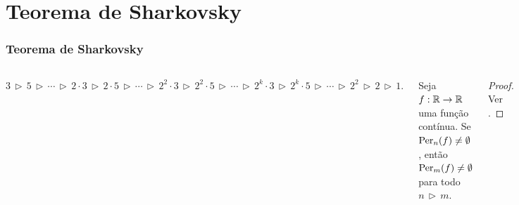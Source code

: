 \section{Teorema de Sharkovsky}


\begin{frame}
\vspace{5pt}
\frametitle{Teorema de Sharkovsky}
\begin{columns}
\column{\dimexpr\paperwidth-15pt}

\begin{definition}
$3 \, \triangleright \, 5 
\, \triangleright \, \cdots \, \triangleright \,
2 \cdot 3 \, \triangleright \, 2 \cdot 5 
\, \triangleright \, \cdots \, \triangleright \,
2^2 \cdot 3 \, \triangleright \, 2^2 \cdot 5
\, \triangleright \, \cdots \, \triangleright \,
2^k \cdot 3 \, \triangleright \, 2^k \cdot 5
\, \triangleright \, \cdots \, \triangleright \,
2^2 \, \triangleright \, 2 \, \triangleright \, 1.$
\end{definition}

\vspace{10pt}

\begin{theorem}[Sharkovsky]
Seja $f: \mathbb{R} \to \mathbb{R}$ uma função contínua. Se $\operatorname{Per}_n(f) \neq \emptyset$, então $\operatorname{Per}_m(f) \neq \emptyset$ para todo $n \, \triangleright \, m$.
\end{theorem}

\begin{proof}
Ver \cite{burns}.
\end{proof}

\end{columns}
\end{frame}


